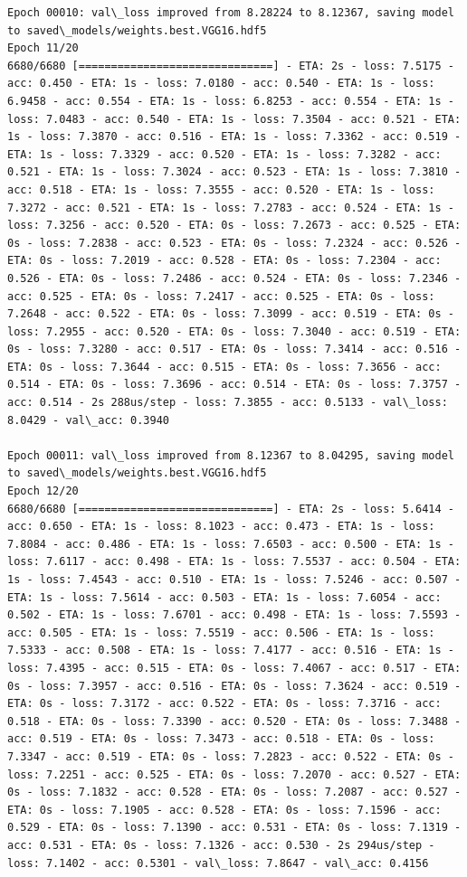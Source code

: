 \documentclass[11pt]{article}
\begin{document}
\begin{Verbatim}[commandchars=\\\{\}]
Epoch 00010: val\_loss improved from 8.28224 to 8.12367, saving model to saved\_models/weights.best.VGG16.hdf5
Epoch 11/20
6680/6680 [==============================] - ETA: 2s - loss: 7.5175 - acc: 0.450 - ETA: 1s - loss: 7.0180 - acc: 0.540 - ETA: 1s - loss: 6.9458 - acc: 0.554 - ETA: 1s - loss: 6.8253 - acc: 0.554 - ETA: 1s - loss: 7.0483 - acc: 0.540 - ETA: 1s - loss: 7.3504 - acc: 0.521 - ETA: 1s - loss: 7.3870 - acc: 0.516 - ETA: 1s - loss: 7.3362 - acc: 0.519 - ETA: 1s - loss: 7.3329 - acc: 0.520 - ETA: 1s - loss: 7.3282 - acc: 0.521 - ETA: 1s - loss: 7.3024 - acc: 0.523 - ETA: 1s - loss: 7.3810 - acc: 0.518 - ETA: 1s - loss: 7.3555 - acc: 0.520 - ETA: 1s - loss: 7.3272 - acc: 0.521 - ETA: 1s - loss: 7.2783 - acc: 0.524 - ETA: 1s - loss: 7.3256 - acc: 0.520 - ETA: 0s - loss: 7.2673 - acc: 0.525 - ETA: 0s - loss: 7.2838 - acc: 0.523 - ETA: 0s - loss: 7.2324 - acc: 0.526 - ETA: 0s - loss: 7.2019 - acc: 0.528 - ETA: 0s - loss: 7.2304 - acc: 0.526 - ETA: 0s - loss: 7.2486 - acc: 0.524 - ETA: 0s - loss: 7.2346 - acc: 0.525 - ETA: 0s - loss: 7.2417 - acc: 0.525 - ETA: 0s - loss: 7.2648 - acc: 0.522 - ETA: 0s - loss: 7.3099 - acc: 0.519 - ETA: 0s - loss: 7.2955 - acc: 0.520 - ETA: 0s - loss: 7.3040 - acc: 0.519 - ETA: 0s - loss: 7.3280 - acc: 0.517 - ETA: 0s - loss: 7.3414 - acc: 0.516 - ETA: 0s - loss: 7.3644 - acc: 0.515 - ETA: 0s - loss: 7.3656 - acc: 0.514 - ETA: 0s - loss: 7.3696 - acc: 0.514 - ETA: 0s - loss: 7.3757 - acc: 0.514 - 2s 288us/step - loss: 7.3855 - acc: 0.5133 - val\_loss: 8.0429 - val\_acc: 0.3940

Epoch 00011: val\_loss improved from 8.12367 to 8.04295, saving model to saved\_models/weights.best.VGG16.hdf5
Epoch 12/20
6680/6680 [==============================] - ETA: 2s - loss: 5.6414 - acc: 0.650 - ETA: 1s - loss: 8.1023 - acc: 0.473 - ETA: 1s - loss: 7.8084 - acc: 0.486 - ETA: 1s - loss: 7.6503 - acc: 0.500 - ETA: 1s - loss: 7.6117 - acc: 0.498 - ETA: 1s - loss: 7.5537 - acc: 0.504 - ETA: 1s - loss: 7.4543 - acc: 0.510 - ETA: 1s - loss: 7.5246 - acc: 0.507 - ETA: 1s - loss: 7.5614 - acc: 0.503 - ETA: 1s - loss: 7.6054 - acc: 0.502 - ETA: 1s - loss: 7.6701 - acc: 0.498 - ETA: 1s - loss: 7.5593 - acc: 0.505 - ETA: 1s - loss: 7.5519 - acc: 0.506 - ETA: 1s - loss: 7.5333 - acc: 0.508 - ETA: 1s - loss: 7.4177 - acc: 0.516 - ETA: 1s - loss: 7.4395 - acc: 0.515 - ETA: 0s - loss: 7.4067 - acc: 0.517 - ETA: 0s - loss: 7.3957 - acc: 0.516 - ETA: 0s - loss: 7.3624 - acc: 0.519 - ETA: 0s - loss: 7.3172 - acc: 0.522 - ETA: 0s - loss: 7.3716 - acc: 0.518 - ETA: 0s - loss: 7.3390 - acc: 0.520 - ETA: 0s - loss: 7.3488 - acc: 0.519 - ETA: 0s - loss: 7.3473 - acc: 0.518 - ETA: 0s - loss: 7.3347 - acc: 0.519 - ETA: 0s - loss: 7.2823 - acc: 0.522 - ETA: 0s - loss: 7.2251 - acc: 0.525 - ETA: 0s - loss: 7.2070 - acc: 0.527 - ETA: 0s - loss: 7.1832 - acc: 0.528 - ETA: 0s - loss: 7.2087 - acc: 0.527 - ETA: 0s - loss: 7.1905 - acc: 0.528 - ETA: 0s - loss: 7.1596 - acc: 0.529 - ETA: 0s - loss: 7.1390 - acc: 0.531 - ETA: 0s - loss: 7.1319 - acc: 0.531 - ETA: 0s - loss: 7.1326 - acc: 0.530 - 2s 294us/step - loss: 7.1402 - acc: 0.5301 - val\_loss: 7.8647 - val\_acc: 0.4156


\end{Verbatim}
\end{document}
